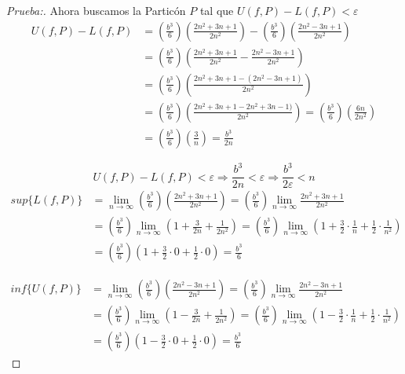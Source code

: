 \documentclass[12pt]{article}
\begin{document}
\begin{enumerate}[\hspace{9px} a)]
\begin{proof}[Prueba:]
        Ahora buscamos la Partic\'on $P$ tal que \(U(f,P)-L(f,P)<\varepsilon\)
        \begin{align*}
            U(f,P)-L(f,P) &= \left(\frac{b^3}{6}\right)\left(\frac{2n^2+3n+1}{2n^2}\right)-\left(\frac{b^3}{6}\right)\left(\frac{2n^2-3n+1}{2n^2}\right) \\
            &= \left(\frac{b^3}{6}\right)\left(\frac{2n^2+3n+1}{2n^2}-\frac{2n^2-3n+1}{2n^2}\right) \\
            &= \left(\frac{b^3}{6}\right)\left(\frac{2n^2+3n+1-(2n^2-3n+1)}{2n^2}\right) \\
            &= \left(\frac{b^3}{6}\right)\left(\frac{2n^2+3n+1-2n^2+3n-1)}{2n^2}\right) = \left(\frac{b^3}{6}\right)\left(\frac{6n}{2n^2}\right) \\ 
            &= \left(\frac{b^3}{6}\right)\left(\frac{3}{n}\right) = \frac{b^3}{2n}
        \end{align*}

        \begin{equation*}
            U(f,P)-L(f,P)<\varepsilon \Longrightarrow \frac{b^3}{2n}<\varepsilon \Longrightarrow \frac{b^3}{2\varepsilon}<n
        \end{equation*}
        \begin{align*}
            sup\{L(f,P)\} &= \lim_{n \to \infty}\left(\frac{b^3}{6}\right)\left(\frac{2n^2+3n+1}{2n^2}\right) = \left(\frac{b^3}{6}\right)\lim_{n \to \infty}\frac{2n^2+3n+1}{2n^2}\\
            &= \left(\frac{b^3}{6}\right)\lim_{n \to \infty}\left(1+\frac{3}{2n}+\frac{1}{2n^2}\right) = \left(\frac{b^3}{6}\right)\lim_{n \to \infty}\left(1+\frac{3}{2}\cdot\frac{1}{n}+\frac{1}{2}\cdot\frac{1}{n^2}\right)\\
            &= \left(\frac{b^3}{6}\right)\left(1+\frac{3}{2}\cdot0+\frac{1}{2}\cdot0\right) = \frac{b^3}{6}
        \end{align*}

        \begin{align*}
            inf\{U(f,P)\} &= \lim_{n \to \infty}\left(\frac{b^3}{6}\right)\left(\frac{2n^2-3n+1}{2n^2}\right) = \left(\frac{b^3}{6}\right)\lim_{n \to \infty}\frac{2n^2-3n+1}{2n^2}\\
            &= \left(\frac{b^3}{6}\right)\lim_{n \to \infty}\left(1-\frac{3}{2n}+\frac{1}{2n^2}\right) = \left(\frac{b^3}{6}\right)\lim_{n \to \infty}\left(1-\frac{3}{2}\cdot\frac{1}{n}+\frac{1}{2}\cdot\frac{1}{n^2}\right)\\
            &= \left(\frac{b^3}{6}\right)\left(1-\frac{3}{2}\cdot0+\frac{1}{2}\cdot0\right) = \frac{b^3}{6}
        \end{align*}


\end{proof}
\end{enumerate}
\end{document}
